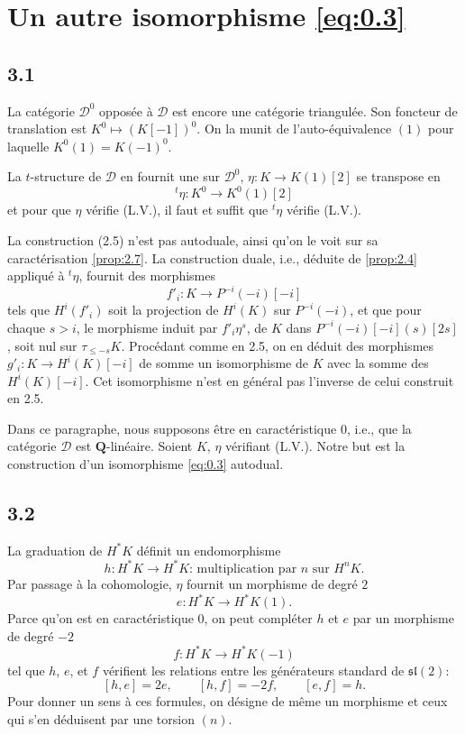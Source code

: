 \documentclass[11pt,a4paper]{article}
\theoremstyle{plain}
\theoremstyle{definition}
\newcommand{\cD}{\mathscr{D}}
\newcommand{\bQ}{\mathbf{Q}}
\begin{document}
\section{Un autre isomorphisme \eqref{eq:0.3}}

\subsection*{3.1}
La cat\'egorie $\cD^0$ oppos\'ee \`a $\cD$ est encore une cat\'egorie triangul\'ee. Son foncteur de translation est $K^0 \mapsto (K[-1])^0$. On la munit de l'auto-\'equivalence $(1)$ pour laquelle $K^0(1) = K(-1)^0$.

La $t$-structure de $\cD$ en fournit une sur $\cD^0$, $\eta \colon K \to K(1)[2]$ se transpose en
\[
{}^t\eta \colon K^0 \to K^0(1)[2]
\]
et pour que $\eta$ v\'erifie (L.V.), il faut et suffit que ${}^t\eta$ v\'erifie (L.V.).

La construction (2.5) n'est pas autoduale, ainsi qu'on le voit sur sa caract\'erisation \ref{prop:2.7}. La construction duale, i.e., d\'eduite de \ref{prop:2.4} appliqu\'e \`a ${}^t\eta$, fournit des morphismes
\[
f'_i \colon K \to P^{-i}(-i)[-i]
\]
tels que $H^i(f'_i)$ soit la projection de $H^i(K)$ sur $P^{-i}(-i)$, et que pour chaque $s > i$, le morphisme induit par $f'_i \eta^s$, de $K$ dans $P^{-i}(-i)[-i](s)[2s]$, soit nul sur $\tau_{\leqslant -s} K$. Proc\'edant comme en 2.5, on en d\'eduit des morphismes $g'_i \colon K \to H^i(K)[-i]$ de somme un isomorphisme de $K$ avec la somme des $H^i(K)[-i]$. Cet isomorphisme n'est en g\'en\'eral pas l'inverse de celui construit en 2.5.

Dans ce paragraphe, nous supposons \^etre en caract\'eristique $0$, i.e., que la cat\'egorie $\cD$ est $\bQ$-lin\'eaire. Soient $K$, $\eta$ v\'erifiant (L.V.). Notre but est la construction d'un isomorphisme \eqref{eq:0.3} autodual.

\subsection*{3.2}
La graduation de $H^*K$ d\'efinit un endomorphisme
\[
h \colon H^* K \to H^* K \text{: multiplication par } n \text{ sur } H^n K.
\]
Par passage \`a la cohomologie, $\eta$ fournit un morphisme de degr\'e $2$
\[
e \colon H^* K \to H^* K(1).
\]
Parce qu'on est en caract\'eristique $0$, on peut compl\'eter $h$ et $e$ par un morphisme de degr\'e $-2$
\[
f \colon H^* K \to H^* K(-1)
\]
tel que $h$, $e$, et $f$ v\'erifient les relations entre les g\'en\'erateurs standard de $\mathfrak{sl}(2)$:
\[
[h,e] = 2e, \qquad [h,f] = -2f, \qquad [e,f] = h.
\]
Pour donner un sens \`a ces formules, on d\'esigne de m\^eme un morphisme et ceux qui s'en d\'eduisent par une torsion $(n)$.
\end{document}
